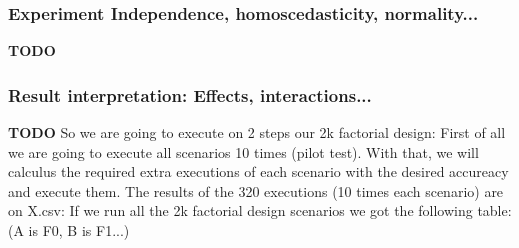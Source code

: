 \documentclass[12pt]{article}
\begin{document}
\subsubsection{Experiment Independence, homoscedasticity, normality...}
\textbf{TODO}
\subsubsection{Result interpretation: Effects, interactions...}
\textbf{TODO}
So we are going to execute on 2 steps our 2k factorial design: First of all we are going to execute all scenarios 10 times (pilot test). With that, we will calculus the required extra executions of each scenario with the desired accureacy and execute them.
The results of the 320 executions (10 times each scenario) are on X.csv:
If we run all the 2k factorial design scenarios we got the following table:
(A is F0, B is F1...)
\end{document}
